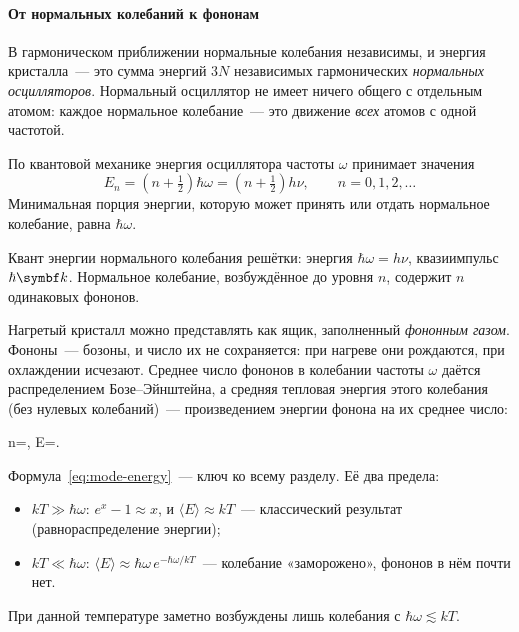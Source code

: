 \paragraph{От нормальных колебаний к фононам}
В гармоническом приближении нормальные колебания независимы, и энергия
кристалла~— это сумма энергий $3N$ независимых гармонических
\emph{нормальных осцилляторов}. Нормальный осциллятор не имеет ничего
общего с отдельным атомом: каждое нормальное колебание~— это движение
\emph{всех} атомов с одной частотой.

По квантовой механике энергия осциллятора частоты $\omega$ принимает
значения
\[
E_n=\left(n+\tfrac12\right)\hbar\omega=\left(n+\tfrac12\right)h\nu,
\qquad n=0,1,2,\ldots
\]
Минимальная порция энергии, которую может принять или отдать нормальное
колебание, равна $\hbar\omega$.

\begin{opredelenie}[Фонон]
Квант энергии нормального колебания решётки: энергия $\hbar\omega=h\nu$,
квазиимпульс $\hbar\vb k$. Нормальное колебание, возбуждённое до уровня
$n$, содержит $n$ одинаковых фононов.
\end{opredelenie}

Нагретый кристалл можно представлять как ящик, заполненный \emph{фононным
газом}. Фононы~— бозоны, и число их не сохраняется: при нагреве они
рождаются, при охлаждении исчезают. Среднее число фононов в колебании
частоты $\omega$ даётся распределением Бозе--Эйнштейна, а средняя
тепловая энергия этого колебания (без нулевых колебаний)~— произведением
энергии фонона на их среднее число:
\begin{keyeq}\label{eq:mode-energy}
\langle n\rangle=,\qquad
\langle E\rangle=.
\end{keyeq}

\begin{smysl}
Формула~\eqref{eq:mode-energy}~— ключ ко всему разделу. Её два предела:
\begin{itemize}
\item $kT\gg\hbar\omega$: $e^{x}-1\approx x$, и $\langle E\rangle\approx kT$~—
классический результат (равнораспределение энергии);
\item $kT\ll\hbar\omega$: $\langle E\rangle\approx\hbar\omega\,e^{-\hbar\omega/kT}$~—
колебание «заморожено», фононов в нём почти нет.
\end{itemize}
При данной температуре заметно возбуждены лишь колебания с
$\hbar\omega\lesssim kT$.
\end{smysl}
